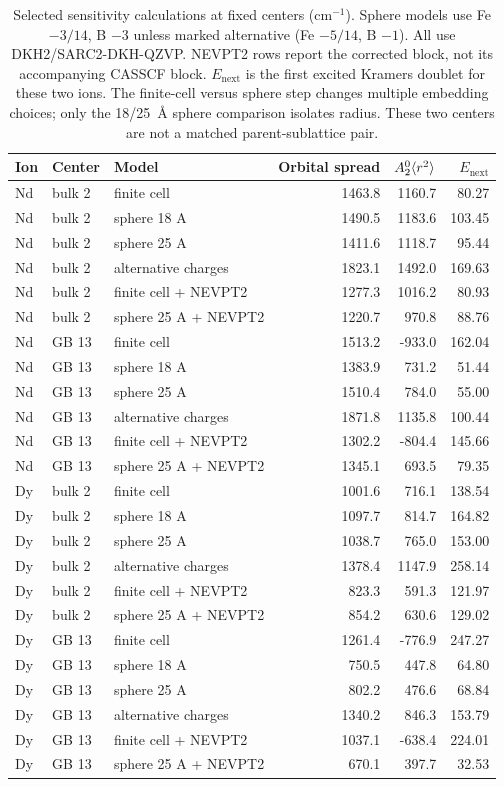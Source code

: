 \begin{table}[H]
\centering
\footnotesize
\setlength{\tabcolsep}{4pt}
\caption{Selected sensitivity calculations at fixed centers (cm$^{-1}$). Sphere models use Fe $-3/14$, B $-3$ unless marked alternative (Fe $-5/14$, B $-1$). All use DKH2/SARC2-DKH-QZVP. NEVPT2 rows report the corrected block, not its accompanying CASSCF block. $E_{\mathrm{next}}$ is the first excited Kramers doublet for these two ions. The finite-cell versus sphere step changes multiple embedding choices; only the 18/25~\AA{} sphere comparison isolates radius. These two centers are not a matched parent-sublattice pair.}\label{tab:S6}
\begin{tabular}{lllrrr}
\toprule
Ion & Center & Model & Orbital spread & $A_2^0\langle r^2\rangle$ & $E_{\mathrm{next}}$ \\
\midrule
Nd & bulk 2 & finite cell & 1463.8 & 1160.7 & 80.27 \\
Nd & bulk 2 & sphere 18 A & 1490.5 & 1183.6 & 103.45 \\
Nd & bulk 2 & sphere 25 A & 1411.6 & 1118.7 & 95.44 \\
Nd & bulk 2 & alternative charges & 1823.1 & 1492.0 & 169.63 \\
Nd & bulk 2 & finite cell + NEVPT2 & 1277.3 & 1016.2 & 80.93 \\
Nd & bulk 2 & sphere 25 A + NEVPT2 & 1220.7 & 970.8 & 88.76 \\
Nd & GB 13 & finite cell & 1513.2 & -933.0 & 162.04 \\
Nd & GB 13 & sphere 18 A & 1383.9 & 731.2 & 51.44 \\
Nd & GB 13 & sphere 25 A & 1510.4 & 784.0 & 55.00 \\
Nd & GB 13 & alternative charges & 1871.8 & 1135.8 & 100.44 \\
Nd & GB 13 & finite cell + NEVPT2 & 1302.2 & -804.4 & 145.66 \\
Nd & GB 13 & sphere 25 A + NEVPT2 & 1345.1 & 693.5 & 79.35 \\
Dy & bulk 2 & finite cell & 1001.6 & 716.1 & 138.54 \\
Dy & bulk 2 & sphere 18 A & 1097.7 & 814.7 & 164.82 \\
Dy & bulk 2 & sphere 25 A & 1038.7 & 765.0 & 153.00 \\
Dy & bulk 2 & alternative charges & 1378.4 & 1147.9 & 258.14 \\
Dy & bulk 2 & finite cell + NEVPT2 & 823.3 & 591.3 & 121.97 \\
Dy & bulk 2 & sphere 25 A + NEVPT2 & 854.2 & 630.6 & 129.02 \\
Dy & GB 13 & finite cell & 1261.4 & -776.9 & 247.27 \\
Dy & GB 13 & sphere 18 A & 750.5 & 447.8 & 64.80 \\
Dy & GB 13 & sphere 25 A & 802.2 & 476.6 & 68.84 \\
Dy & GB 13 & alternative charges & 1340.2 & 846.3 & 153.79 \\
Dy & GB 13 & finite cell + NEVPT2 & 1037.1 & -638.4 & 224.01 \\
Dy & GB 13 & sphere 25 A + NEVPT2 & 670.1 & 397.7 & 32.53 \\
\bottomrule
\end{tabular}
\end{table}

